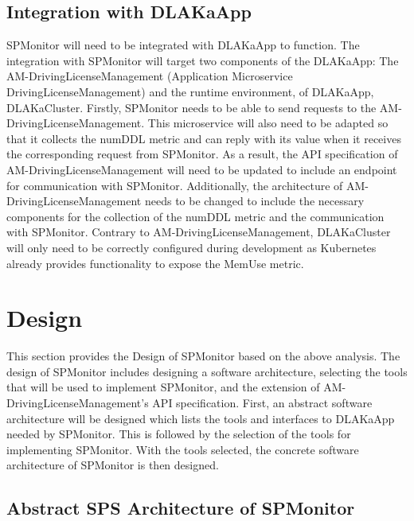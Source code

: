 \subsection{Integration with DLAKaApp}

SPMonitor will need to be integrated with DLAKaApp to function. The integration
with SPMonitor will target two components of the DLAKaApp: The AM-DrivingLicenseManagement (Application
Microservice DrivingLicenseManagement) and the runtime environment, of DLAKaApp,
DLAKaCluster. Firstly, SPMonitor needs to be able to send requests to the
AM-DrivingLicenseManagement. This microservice will also
need to be adapted so that it collects the numDDL metric and can reply with
its value when it receives the corresponding request from SPMonitor. As a
result, the API specification of AM-DrivingLicenseManagement will need to be
updated to include an endpoint for communication with SPMonitor. Additionally,
the architecture of AM-DrivingLicenseManagement needs to be changed to include the
necessary components for the collection of the numDDL metric and the
communication with SPMonitor. Contrary to
AM-DrivingLicenseManagement, DLAKaCluster will only need to be correctly
configured during development as Kubernetes already provides functionality to
expose the MemUse metric.

\section{Design}
\label{sec:design}

This section provides the Design of SPMonitor based on the above analysis.
The design of SPMonitor includes designing a software architecture,
selecting the tools that will be used to implement SPMonitor, and
the extension of AM-DrivingLicenseManagement's API specification.
First, an abstract software architecture will be designed which lists
the tools and interfaces to DLAKaApp needed by SPMonitor.
This is followed by the selection of the tools for implementing SPMonitor.
With the tools selected, the concrete software architecture of SPMonitor is then designed.

\subsection{Abstract SPS Architecture of SPMonitor}

